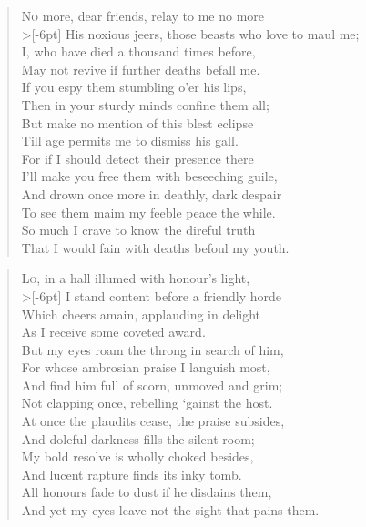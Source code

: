 \documentclass[a5paper, 12pt, oneside]{memoir}
\begin{document}
\PoemTitle{}
\begin{verse}
    \lettrine{N}{o} more, dear friends, relay to me no more \\>[-6pt]
    His noxious jeers, those beasts who love to maul me; \\
    I, who have died a thousand times before, \\
    May not revive if further deaths befall me. \\ 
    If you espy them stumbling o'er his lips, \\
    Then in your sturdy minds confine them all; \\
    But make no mention of this blest eclipse \\
    Till age permits me to dismiss his gall. \\
    For if I should detect their presence there \\
    I'll make you free them with beseeching guile, \\
    And drown once more in deathly, dark despair \\
    To see them maim my feeble peace the while. \\
    \vin So much I crave to know the direful truth \\
    \vin That I would fain with deaths befoul my youth.
\end{verse}

\PoemTitle{}
\begin{verse}
    \lettrine{L}{o}, in a hall illumed with honour's light, \\>[-6pt]
    I stand content before a friendly horde \\
    Which cheers amain, applauding in delight \\
    As I receive some coveted award. \\
    But my eyes roam the throng in search of him, \\
    For whose ambrosian praise I languish most, \\
    And find him full of scorn, unmoved and grim; \\
    Not clapping once, rebelling `gainst the host. \\
    At once the plaudits cease, the praise subsides, \\
    And doleful darkness fills the silent room; \\
    My bold resolve is wholly choked besides, \\
    And lucent rapture finds its inky tomb. \\
    \vin All honours fade to dust if he disdains them, \\
    \vin And yet my eyes leave not the sight that pains them.
\end{verse}
\end{document}
